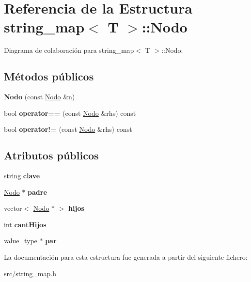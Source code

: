 \hypertarget{structstring__map_1_1Nodo}{}\section{Referencia de la Estructura string\+\_\+map$<$ T $>$\+:\+:Nodo}
\label{structstring__map_1_1Nodo}


Diagrama de colaboración para string\+\_\+map$<$ T $>$\+:\+:Nodo\+:
\subsection*{Métodos públicos}
\begin{DoxyCompactItemize}
\item 
\mbox{\label{structstring__map_1_1Nodo_a0eddd9ae03c7888996d7310db4d86710}} 
{\bfseries Nodo} (const \mbox{\hyperlink{structstring__map_1_1Nodo}{Nodo}} \&n)
\item 
\mbox{\label{structstring__map_1_1Nodo_af2e9d5ba7d7c53daf6a9bc19c7b60579}} 
bool {\bfseries operator==} (const \mbox{\hyperlink{structstring__map_1_1Nodo}{Nodo}} \&rhs) const
\item 
\mbox{\label{structstring__map_1_1Nodo_a714984b89cc84b5a3b46442afd00f88c}} 
bool {\bfseries operator!=} (const \mbox{\hyperlink{structstring__map_1_1Nodo}{Nodo}} \&rhs) const
\end{DoxyCompactItemize}
\subsection*{Atributos públicos}
\begin{DoxyCompactItemize}
\item 
\mbox{\label{structstring__map_1_1Nodo_a651661194bd824732decf5a044a10631}} 
string {\bfseries clave}
\item 
\mbox{\label{structstring__map_1_1Nodo_a0253586cd93ddd52ad4c1951bc7975d0}} 
\mbox{\hyperlink{structstring__map_1_1Nodo}{Nodo}} $\ast$ {\bfseries padre}
\item 
\mbox{\label{structstring__map_1_1Nodo_af4329e335135db81374fc9b5e1f3e99b}} 
vector$<$ \mbox{\hyperlink{structstring__map_1_1Nodo}{Nodo}} $\ast$ $>$ {\bfseries hijos}
\item 
\mbox{\label{structstring__map_1_1Nodo_a0d852b5c2f9a82e0375820336cdf7d19}} 
int {\bfseries cant\+Hijos}
\item 
\mbox{\label{structstring__map_1_1Nodo_a317ac83e461c762093feb51b98d48b94}} 
value\+\_\+type $\ast$ {\bfseries par}
\end{DoxyCompactItemize}


La documentación para esta estructura fue generada a partir del siguiente fichero\+:\begin{DoxyCompactItemize}
\item 
src/string\+\_\+map.\+h\end{DoxyCompactItemize}
